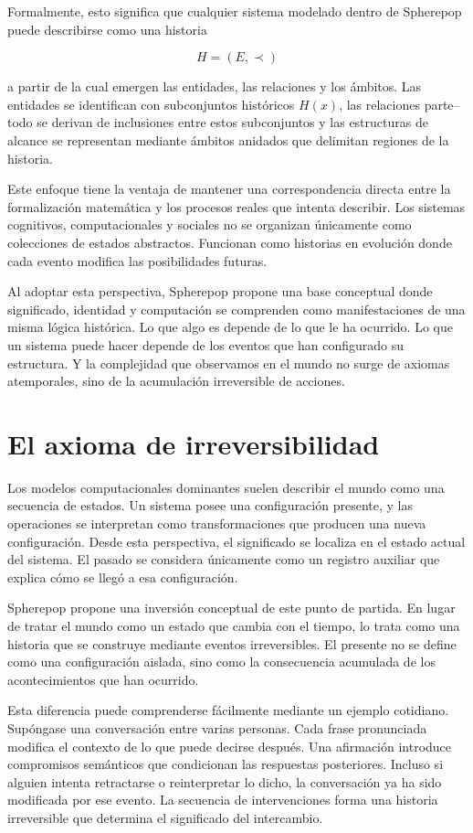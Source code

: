 \documentclass[12pt]{article}
\begin{document}
Formalmente, esto significa que cualquier sistema modelado dentro de Spherepop puede describirse como una historia

\[
H = (E, \prec)
\]

a partir de la cual emergen las entidades, las relaciones y los ámbitos. Las entidades se identifican con subconjuntos históricos \(H(x)\), las relaciones parte--todo se derivan de inclusiones entre estos subconjuntos y las estructuras de alcance se representan mediante ámbitos anidados que delimitan regiones de la historia.

Este enfoque tiene la ventaja de mantener una correspondencia directa entre la formalización matemática y los procesos reales que intenta describir. Los sistemas cognitivos, computacionales y sociales no se organizan únicamente como colecciones de estados abstractos. Funcionan como historias en evolución donde cada evento modifica las posibilidades futuras.

Al adoptar esta perspectiva, Spherepop propone una base conceptual donde significado, identidad y computación se comprenden como manifestaciones de una misma lógica histórica. Lo que algo es depende de lo que le ha ocurrido. Lo que un sistema puede hacer depende de los eventos que han configurado su estructura. Y la complejidad que observamos en el mundo no surge de axiomas atemporales, sino de la acumulación irreversible de acciones.

\section{El axioma de irreversibilidad}

Los modelos computacionales dominantes suelen describir el mundo como una secuencia de estados. Un sistema posee una configuración presente, y las operaciones se interpretan como transformaciones que producen una nueva configuración. Desde esta perspectiva, el significado se localiza en el estado actual del sistema. El pasado se considera únicamente como un registro auxiliar que explica cómo se llegó a esa configuración.

Spherepop propone una inversión conceptual de este punto de partida. En lugar de tratar el mundo como un estado que cambia con el tiempo, lo trata como una historia que se construye mediante eventos irreversibles. El presente no se define como una configuración aislada, sino como la consecuencia acumulada de los acontecimientos que han ocurrido.

Esta diferencia puede comprenderse fácilmente mediante un ejemplo cotidiano. Supóngase una conversación entre varias personas. Cada frase pronunciada modifica el contexto de lo que puede decirse después. Una afirmación introduce compromisos semánticos que condicionan las respuestas posteriores. Incluso si alguien intenta retractarse o reinterpretar lo dicho, la conversación ya ha sido modificada por ese evento. La secuencia de intervenciones forma una historia irreversible que determina el significado del intercambio.
\end{document}
